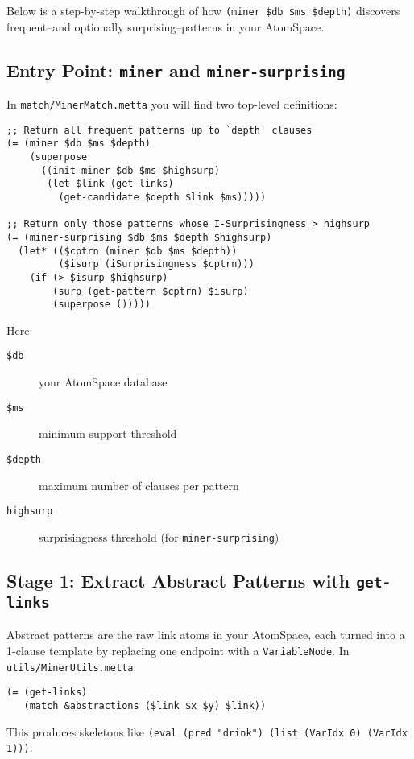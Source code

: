 \documentclass{article}
\begin{document}
Below is a step-by-step walkthrough of how \texttt{(miner \$db \$ms \$depth)} discovers frequent--and optionally surprising--patterns in your AtomSpace.

\subsection{Entry Point: \texttt{miner} and \texttt{miner-surprising}}

In \texttt{match/MinerMatch.metta} you will find two top-level definitions:

\begin{verbatim}
;; Return all frequent patterns up to `depth' clauses
(= (miner $db $ms $depth)
    (superpose
      ((init-miner $db $ms $highsurp)
       (let $link (get-links)
         (get-candidate $depth $link $ms)))))

;; Return only those patterns whose I-Surprisingness > highsurp
(= (miner-surprising $db $ms $depth $highsurp)
  (let* (($cptrn (miner $db $ms $depth))
         ($isurp (iSurprisingness $cptrn)))
    (if (> $isurp $highsurp)
        (surp (get-pattern $cptrn) $isurp)
        (superpose ()))))
\end{verbatim}

\noindent
Here:
\begin{description}
  \item[\texttt{\$db}] your AtomSpace database
  \item[\texttt{\$ms}] minimum support threshold
  \item[\texttt{\$depth}] maximum number of clauses per pattern
  \item[\texttt{highsurp}] surprisingness threshold (for \texttt{miner-surprising})
\end{description}

\subsection{Stage 1: Extract Abstract Patterns with \texttt{get-links}}

Abstract patterns are the raw link atoms in your AtomSpace, each turned into a 1-clause template by replacing one endpoint with a \texttt{VariableNode}.  In \texttt{utils/MinerUtils.metta}:

\begin{verbatim}
(= (get-links)
   (match &abstractions ($link $x $y) $link))
\end{verbatim}

\noindent
This produces skeletons like \texttt{(eval (pred "drink") (list (VarIdx 0) (VarIdx 1)))}.
\end{document}
